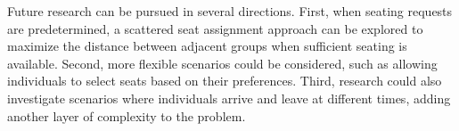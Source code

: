 



Future research can be pursued in several directions. First, when seating requests are predetermined, a scattered seat assignment approach can be explored to maximize the distance between adjacent groups when sufficient seating is available. Second, more flexible scenarios could be considered, such as allowing individuals to select seats based on their preferences. Third, research could also investigate scenarios where individuals arrive and leave at different times, adding another layer of complexity to the problem.


